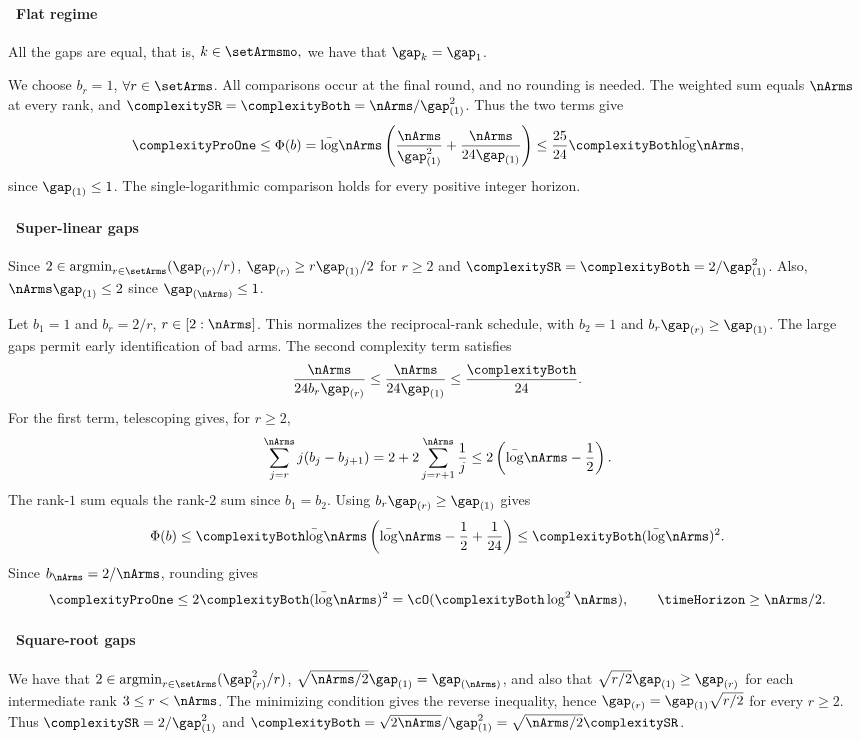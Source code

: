 \paragraph{\raisebox{.04cm}{\textcolor{bull}{$\blacktriangleright$}}~Flat regime}  All the gaps are equal, that is,
$k\in\setArmsmo,$ we have that $\gap_k=\gap_{1}$. 

\smallskip
\noindent
We choose $b_r=1$, $\forall r\in\setArms$.
All comparisons occur at the final round, and no rounding is needed.
The weighted sum equals $\nArms$ at every rank, and
$\complexitySR=\complexityBoth=\nArms/\gap_{(1)}^2$. Thus the two terms give
\[
\complexityProOne\leq\Phi(b)
=\bar\log\nArms\left(\frac{\nArms}{\gap_{(1)}^2}+\frac{\nArms}{24\gap_{(1)}}\right)
\leq\frac{25}{24}\complexityBoth\bar\log\nArms,
\]
since $\gap_{(1)}\leq1$. The single-logarithmic comparison holds for every
positive integer horizon.

\paragraph{\raisebox{.04cm}{\textcolor{bull}{$\blacktriangleright$}}~Super-linear gaps}  Since $2\in\argmin_{r\in\setArms}(\gap_{(r)}/r)$,
$\gap_{(r)}\geq r\gap_{(1)}/2$ for $r\geq2$ and
$\complexitySR=\complexityBoth=2/\gap_{(1)}^2$.
Also, $\nArms\gap_{(1)}\leq2$ since $\gap_{(\nArms)}\leq1$.

\smallskip
\noindent
Let $b_1=1$ and $b_r=2/r$, $r\in[2:\nArms]$.
This normalizes the reciprocal-rank schedule, with $b_2=1$ and
$b_r\gap_{(r)}\geq\gap_{(1)}$. The large gaps permit early identification
of bad arms.
The second complexity term satisfies
\[
\frac{\nArms}{24b_r\gap_{(r)}}
\leq\frac{\nArms}{24\gap_{(1)}}\leq\frac{\complexityBoth}{24}.
\]
For the first term, telescoping gives, for $r\geq2$,
\[
\sum_{j=r}^{\nArms}j(b_j-b_{j+1})
=2+2\sum_{j=r+1}^{\nArms}\frac1j
\leq2\left(\bar\log\nArms-\frac12\right).
\]
The rank-$1$ sum equals the rank-$2$ sum since $b_1=b_2$.
Using $b_r\gap_{(r)}\geq\gap_{(1)}$ gives
\[
\Phi(b)\leq\complexityBoth\bar\log\nArms
\left(\bar\log\nArms-\frac12+\frac1{24}\right)
\leq\complexityBoth(\bar\log\nArms)^2.
\]
Since $b_{\nArms}=2/\nArms$, rounding gives
\[
\complexityProOne\leq2\complexityBoth(\bar\log\nArms)^2
=\cO(\complexityBoth\log^2\nArms),\qquad\timeHorizon\geq\nArms/2.
\]

\paragraph{\raisebox{.04cm}{\textcolor{bull}{$\blacktriangleright$}}~Square-root gaps} We have that $2\in\argmin_{r\in\setArms}(\gap^2_{(r)}/r)$,
$\sqrt{\nArms/2}\gap_{(1)}=\gap_{(\nArms)}$, and also that
$\sqrt{r/2}\gap_{(1)}\geq\gap_{(r)}$ for each intermediate rank $3\leq r<\nArms$.
The minimizing condition gives the reverse inequality, hence
$\gap_{(r)}=\gap_{(1)}\sqrt{r/2}$ for every $r\geq2$.
Thus $\complexitySR=2/\gap_{(1)}^2$ and
$\complexityBoth=\sqrt{2\nArms}/\gap_{(1)}^2=\sqrt{\nArms/2}\complexitySR$.

